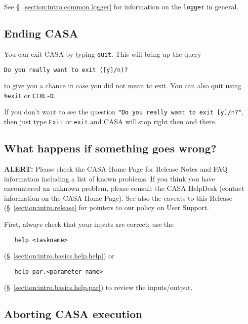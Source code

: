 See \S~\ref{section:intro.common.logger} for information on the
{\tt logger} in general.

\subsection{Ending CASA}
\label{section:intro.basics.ending}

You can exit CASA by typing {\tt quit}.  This will bring up the
query
\small
\begin{verbatim}
Do you really want to exit ([y]/n)?
\end{verbatim}
\normalsize
to give you a chance in case you did not mean to exit.  You can
also quit using {\tt \%exit} or {\tt CTRL-D}.

If you don't want to see the question {\tt "Do you really want to exit
[y]/n?"}, then just type {\tt Exit} or {\tt exit} and CASA will stop
right then and there.

\subsection{What happens if something goes wrong?}
\label{section:intro.basics.wrong}

{\bf ALERT:} Please check the CASA Home Page for Release
Notes and FAQ information including a list of known problems.  If you think you
have encountered an unknown problem, please consult the CASA HelpDesk
(contact information on the CASA Home Page).  
See also the caveats to this Release (\S~\ref{section:intro.release} 
for pointers to our policy on User Support.

First, always check that your inputs are correct; use the
\small
\begin{verbatim}
   help <taskname>
\end{verbatim}
\normalsize
(\S~\ref{section:intro.basics.help.help}) or
\small
\begin{verbatim}
   help par.<parameter name>
\end{verbatim}
\normalsize
(\S~\ref{section:intro.basics.help.par}) to review the inputs/output.

\subsection{Aborting CASA execution}
\label{section:intro.basics.wrong.abort}

